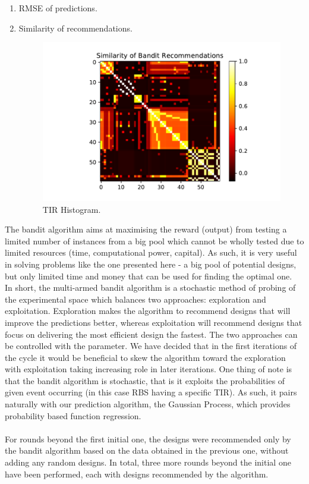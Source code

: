 \documentclass{article}
\begin{document}
\begin{enumerate}
    \item RMSE of predictions.
    
    \item Similarity of recommendations. 
    \begin{figure}[t]
    \centering
    \includegraphics[scale=0.7]{plots/similarity_first_round_recommendation.pdf}
    \caption{TIR Histogram.}
    \label{fig: TIR Histogram.}
\end{figure}
\end{enumerate}{}

The bandit algorithm aims at maximising the reward (output) from testing a limited number of instances from a big pool which cannot be wholly tested due to limited resources (time, computational power, capital). As such, it is very useful in solving problems like the one presented here - a big pool of potential designs, but only limited time and money that can be used for finding the optimal one.\\
In short, the multi-armed bandit algorithm is a stochastic method of probing of the experimental space which balances two approaches: exploration and exploitation. Exploration makes the algorithm to recommend designs that will improve the predictions better, whereas exploitation will recommend designs that focus on delivering the most efficient design the fastest. The two approaches can be controlled with the \textbeta\enspace parameter. We have decided that in the first iterations of the cycle it would be beneficial to skew the algorithm toward the exploration with exploitation taking increasing role in later iterations. One thing of note is that the bandit algorithm is stochastic, that is it exploits the probabilities of given event occurring (in this case RBS having a specific TIR). As such, it pairs naturally with our prediction algorithm, the Gaussian Process, which provides probability based function regression.\\
\\
For rounds beyond the first initial one, the designs were recommended only by the bandit algorithm based on the data obtained in the previous one, without adding any random designs. In total, three more rounds beyond the initial one have been performed, each with designs recommended by the algorithm. 
\end{document}
